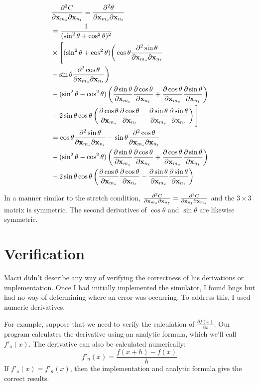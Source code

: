 \documentclass[twocolumn]{article}
\newcommand{\twocolumnonly}[1]{#1}
\newcommand{\twocolbreakal}{\twocolumnonly{\notag \\&}}
\newcommand{\pfrac}[2]{
    \frac{\partial #1}{\partial #2}
}
\newcommand{\pfractwo}[3]{
    \frac{\partial^2 #1}{\partial #2 \partial #3}
}
\newcommand{\x}{{\bf x}}
\newcommand{\xms}{\x_{m_s}}
\newcommand{\xnt}{\x_{n_t}}
\begin{document}
\begin{align}
&\pfractwo{C}{\xms}{\xnt} = \pfractwo{\theta}{\xms}{\xnt} \\
&= \frac{1}{(\sin^2 \theta + \cos^2 \theta)^2} \twocolbreakal
  \times \Bigg[
    (\sin^2 \theta + \cos^2 \theta)
    \bigg(\cos \theta \pfractwo{\sin \theta}{\xms}{\xnt} \twocolbreakal
          - \sin \theta \pfractwo{\cos \theta}{\xms}{\xnt}\bigg) \twocolbreakal
    + (\sin^2 \theta - \cos^2 \theta)
      \left(\pfrac{\sin \theta}{\xms}\pfrac{\cos \theta}{\xnt} +
       \pfrac{\cos \theta}{\xms} \pfrac{\sin \theta}{\xnt}\right) \twocolbreakal
    + 2 \sin\theta \cos\theta
      \left(\pfrac{\cos \theta}{\xms}\pfrac{\cos \theta}{\xnt} -
       \pfrac{\sin \theta}{\xms} \pfrac{\sin \theta}{\xnt}\right)
  \Bigg] \\
\label{eq:d2Cdxmdxn}
&= \cos \theta \pfractwo{\sin \theta}{\xms}{\xnt}
          - \sin \theta \pfractwo{\cos \theta}{\xms}{\xnt} \twocolbreakal
    + (\sin^2 \theta - \cos^2 \theta)
      \left(\pfrac{\sin \theta}{\xms}\pfrac{\cos \theta}{\xnt} +
       \pfrac{\cos \theta}{\xms} \pfrac{\sin \theta}{\xnt}\right) \twocolbreakal
    + 2 \sin\theta \cos\theta
      \left(\pfrac{\cos \theta}{\xms}\pfrac{\cos \theta}{\xnt} -
       \pfrac{\sin \theta}{\xms} \pfrac{\sin \theta}{\xnt}\right)
\end{align}

In a manner similar to the stretch condition,
$\pfractwo{C}{\xms}{\xnt} = \pfractwo{C}{\xnt}{\xms}$ and the $3\times3$
matrix is symmetric. The 
second derivatives of $\cos\theta$ and $\sin\theta$ are likewise symmetric.

\section{Verification}

Macri didn't describe any way of verifying the correctness of his derivations
or implementation. Once I had initially implemented the simulator, I found
bugs but had no way of determining where an error was occurring. To address
this, I used numeric derivatives.

For example, suppose that we need to verify the calculation of
$\pfrac{f(x)}{x}$. Our program calculates the derivative using an analytic
formula, which we'll call $f'_a(x)$. The derivative can also be calculated
numerically:
\[ f'_n(x) = \frac{f(x+h)-f(x)}{h} \]
If $f'_a(x) = f'_n(x)$, then the implementation and analytic formula give the
correct results.
\end{document}
